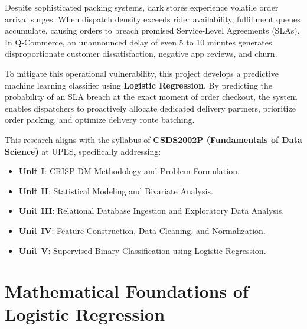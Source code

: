 \documentclass[11pt,a4paper]{article}
\begin{document}
Despite sophisticated packing systems, dark stores experience volatile order arrival surges. When dispatch density exceeds rider availability, fulfillment queues accumulate, causing orders to breach promised Service-Level Agreements (SLAs). In Q-Commerce, an unannounced delay of even 5 to 10 minutes generates disproportionate customer dissatisfaction, negative app reviews, and churn.

To mitigate this operational vulnerability, this project develops a predictive machine learning classifier using \textbf{Logistic Regression}. By predicting the probability of an SLA breach at the exact moment of order checkout, the system enables dispatchers to proactively allocate dedicated delivery partners, prioritize order packing, and optimize delivery route batching.

This research aligns with the syllabus of \textbf{CSDS2002P (Fundamentals of Data Science)} at UPES, specifically addressing:
\begin{itemize}[noitemsep]
    \item \textbf{Unit I}: CRISP-DM Methodology and Problem Formulation.
    \item \textbf{Unit II}: Statistical Modeling and Bivariate Analysis.
    \item \textbf{Unit III}: Relational Database Ingestion and Exploratory Data Analysis.
    \item \textbf{Unit IV}: Feature Construction, Data Cleaning, and Normalization.
    \item \textbf{Unit V}: Supervised Binary Classification using Logistic Regression.
\end{itemize}

\section{Mathematical Foundations of Logistic Regression}
\label{sec:math}
\end{document}
